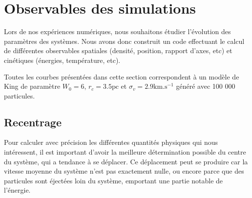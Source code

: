	\section{Observables des simulations}  %


		Lors de nos expériences numériques, nous souhaitons étudier l'évolution des paramètres des systèmes. Nous avons donc construit un code
		effectuant le calcul de différentes observables spatiales (densité, position, rapport d'axes, etc) et cinétiques (énergies,
		température, etc).

		Toutes les courbes présentées dans cette section correspondent à un modèle de King de paramètre $W_0=6$, $r_c =
		3.5\mathrm{pc}$ et $\sigma_v = 2.9 \mathrm{km}.\mathrm{s}^{-1}$ généré avec 100 000 particules.



		\subsection{Recentrage}

			Pour calculer avec précision les différentes quantités physiques qui nous intéressent, il est
			important d'avoir la meilleure détermination possible du centre du système, qui a tendance à se
			déplacer. Ce déplacement peut se produire car la vitesse moyenne du système n'est pas exactement
			nulle, ou encore parce que des particules sont éjectées loin du système, emportant une partie
			notable de l'énergie.


